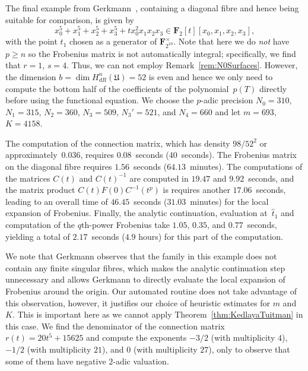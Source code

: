 The final example from Gerkmann~\citep[\S 7.6]{Gerkmann2007}, 
containing a diagonal fibre and hence being suitable for comparison, 
is given by 
\begin{equation}
x_0^5 + x_1^5 + x_2^5 + x_3^5 + t x_0^2 x_1 x_2 x_3 \in \mathbf{F}_2[t][x_0,x_1,x_2,x_3], 
\end{equation}
with the point $t_1$ chosen as a generator of $\mathbf{F}_{2^{10}}^{\times}$. 
Note that here we do \emph{not} have $p \geq n$ so the Frobenius matrix is not 
automatically integral;  specifically, we find that $r = 1$, $s = 4$.  Thus, 
we can not employ Remark~\ref{rem:N0Surfaces}.  However, the dimension 
$b = \dim H_{dR}^{n}(\mathfrak{U}) = 52$ is even and hence we only need to 
compute the bottom half of the coefficients of the polynomial~$p(T)$ directly 
before using the functional equation.  We choose the $p$-adic precision 
$N_0 = 310$, $N_1 = 315$, $N_2 = 360$, $N_3 = 509$, $N_3' = 521$, and 
$N_4 = 660$ and let $m = 693$, $K = 4158$.

The computation of the connection matrix, which has density $98 / 52^2$ 
or approximately~$0.036$, requires $0.08$~seconds ($40$~seconds).  
The Frobenius matrix on the diagonal fibre requires $1.56$~seconds 
($64.13$~minutes).  The computations of the matrices $C(t)$ and $C(t)^{-1}$ 
are computed in $19.47$ and $9.92$~seconds, and the matrix product 
$C(t) F(0) C^{-1}(t^p)$ is requires another $17.06$~seconds, leading 
to an overall time of $46.45$~seconds ($31.03$~minutes) for the local 
expansion of Frobenius.  Finally, the analytic continuation, evaluation 
at~$\hat{t}_1$ and computation of the $q$th-power Frobenius take $1.05$, 
$0.35$, and $0.77$~seconds, yielding a total of $2.17$~seconds ($4.9$ hours) 
for this part of the computation.

We note that Gerkmann observes that the family in this example does 
not contain any finite singular fibres, which makes the analytic 
continuation step unnecessary and allows Gerkmann to directly evaluate 
the local expansion of Frobenius around the origin.  Our automated routine 
does not take advantage of this observation, however, it justifies 
our choice of heuristic estimates for $m$ and $K$.  This is important 
here as we cannot apply Theorem~\ref{thm:KedlayaTuitman} in this case.  
We find the denominator of the connection matrix $r(t) = 20 t^5+15625$ 
and compute the exponents $-3/2$ (with multiplicity $4$), 
$-1/2$ (with multiplicity $21$), and $0$ (with multiplicity $27$), 
only to observe that some of them have negative $2$-adic valuation.

